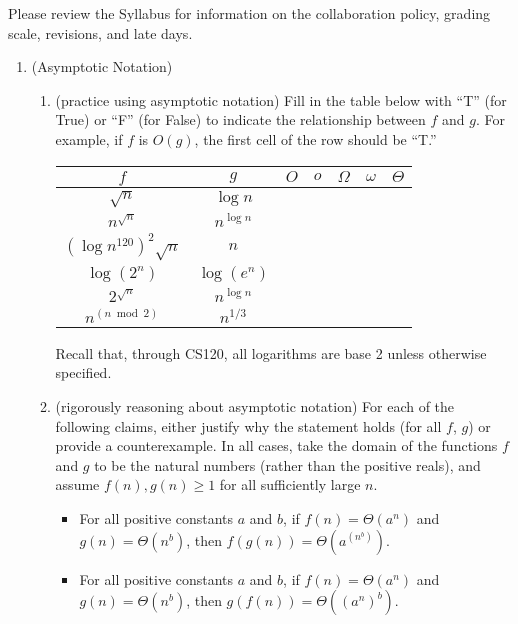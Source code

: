 \documentclass[11pt]{article}
\begin{document}

Please review the Syllabus for information on the collaboration policy, grading scale, revisions, and late days.


\begin{enumerate}
    \item (Asymptotic Notation) 
    \begin{enumerate}
    \item (practice using asymptotic notation)
        Fill in the table below with ``T'' (for True) or ``F'' (for False) to indicate the relationship between $f$ and $g$. For example, if $f$ is $O(g)$, the first cell of the row should be ``T.'' \\
        \begin{table}[h!]
        \centering
        \bgroup
        \def\arraystretch{1.3}
        \begin{tabular}{||c | c || c | c | c | c | c ||}
         \hline
         $f$ & $g$ & $O$ & $o$ & $\Omega$ & $\omega$ & $\Theta$ \\
         \hline\hline
         $\sqrt{n}$ & $\log n$ & & & & & \\ \hline
         $n^{\sqrt{n}}$ & $n^{\log n}$ & & & & & \\ \hline
         $(\log {n^{120}})^2\sqrt{n}$ & $n$ & & & & & \\ \hline
         $\log(2^n)$ & $\log(e^n)$ & & & & & \\ \hline
         $2^{\sqrt{n}}$ & $n^{\log n}$ & & & & & \\ \hline
         $n^{(n \bmod 2)}$ & $n^{1/3}$ & & & & & \\ \hline
        \end{tabular}
        \egroup
        \end{table}
        Recall that, through CS120, all logarithms are base 2 unless otherwise specified. 
        
    \item  (rigorously reasoning about asymptotic notation)  
    For each of the following claims, either justify why the statement holds (for all $f$, $g$) or provide a counterexample. In all cases, take the domain of the functions $f$ and $g$ to be the natural numbers (rather than the positive reals), and assume $f(n), g(n)\geq 1$ for all sufficiently large $n$.
    \begin{itemize}
        \item For all positive constants $a$ and $b$, if $f(n) = \Theta(a^n)$ and $g(n) = \Theta(n^b)$, then $f(g(n)) = \Theta(a^{(n^b)})$.
        \item For all positive constants $a$ and $b$, if $f(n) = \Theta(a^n)$ and $g(n) = \Theta(n^b)$, then $g(f(n)) = \Theta((a^n)^b)$.
    \end{itemize}
  

\end{enumerate}
\end{enumerate}
\end{document}
